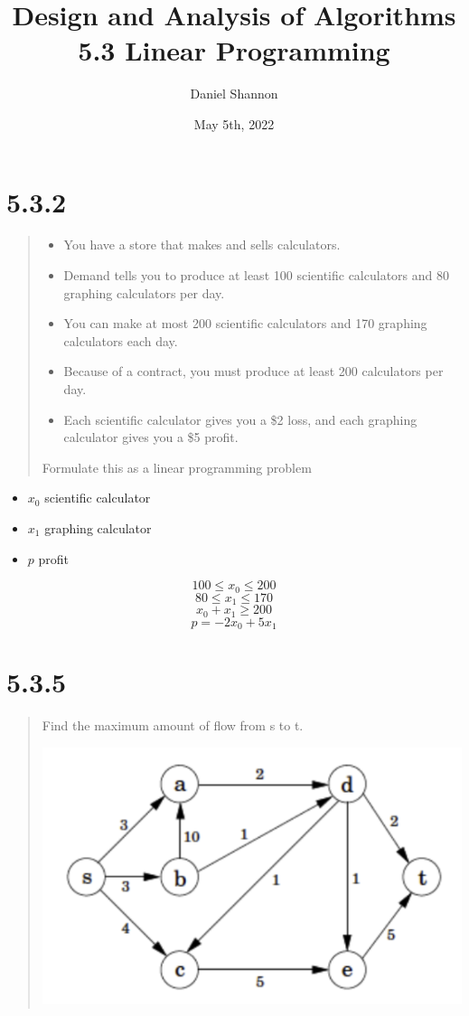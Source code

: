 \documentclass[12pt, letterpaper, twoside]{article}
\title{%
Design and Analysis of Algorithms\\
\large 5.3 Linear Programming
}
\author{Daniel Shannon}
\date{May 5th, 2022}
\begin{document}
\begin{titlepage}
\maketitle
\end{titlepage}

\section*{5.3.2}

\begin{quote}
  \begin{itemize}
    \item You have a store that makes and sells calculators.
    \item Demand tells you to produce at least 100 scientific calculators and 80 graphing calculators per day.
    \item You can make at most 200 scientific calculators and 170 graphing calculators each day.
    \item Because of a contract, you must produce at least 200 calculators per day.
    \item Each scientific calculator gives you a \$2 loss, and each graphing calculator gives you a \$5 profit.    
  \end{itemize}
  Formulate this as a linear programming problem
\end{quote}

\begin{itemize}
  \item $x_0$ scientific calculator
  \item $x_1$ graphing calculator
  \item $p$ profit
\end{itemize}

$$100\le{}x_0\le{}200$$
$$80\le{}x_1\le{}170$$
$$x_0+x_1\ge{}200$$
$$p=-2x_0+5x_1$$

\newpage
\section*{5.3.5}

\begin{quote}
  Find the maximum amount of flow from s to t.
  \begin{center}
    \includegraphics{5_3_5.png}
  \end{center}  
\end{quote}
\end{document}
